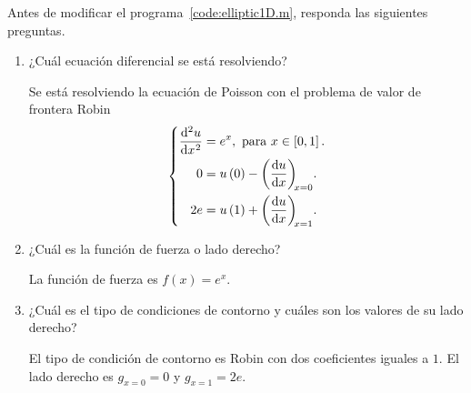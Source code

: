 \begin{problem}

Antes de modificar el programa~\ref{code:elliptic1D.m}, responda las
siguientes preguntas.

\begin{enumerate}
    \item

          ¿Cuál ecuación diferencial se está resolviendo?

          \begin{solution}
              Se está resolviendo la ecuación de Poisson con el
              problema de valor de frontera Robin~\cite{CORBINO2020112326}
              \begin{equation}\label{eq:poisson1drobindconditions}
                  \left\{
                  \begin{aligned}
                      \diff[2]{u}{x}
                       & =e^{x},
                      \text{ para }x\in\left[0,1\right].     \\
                      0
                       & = u\left(0\right)-\diff{u}{x}[x=0]. \\
                      2e
                       & =u\left(1\right)+\diff{u}{x}[x=1].  \\
                  \end{aligned}
                  \right.
              \end{equation}
          \end{solution}

    \item

          ¿Cuál es la función de fuerza o lado derecho?

          \begin{solution}
              La función de fuerza es
              \begin{math}
                  f\left(x\right)=
                  e^{x}
              \end{math}.
          \end{solution}

    \item

          ¿Cuál es el tipo de condiciones de contorno y cuáles son
          los valores de su lado derecho?

          \begin{solution}
              El tipo de condición de contorno es Robin con dos
              coeficientes iguales a $1$.
              El lado derecho es $g_{x=0}=0$ y $g_{x=1}=2e$.
          \end{solution}


\end{enumerate}
\end{problem}
